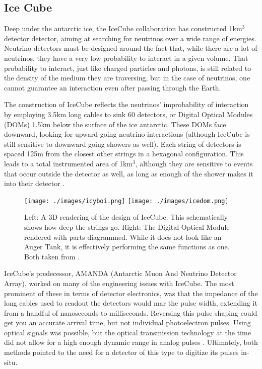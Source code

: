 \subsection{Ice Cube}
\label{icecube}
Deep under the antarctic ice, the IceCube collaboration has constructed 1km$^3$ detector detector, aiming at searching for neutrinos over a wide range of energies. Neutrino detectors must be designed around the fact that, while there are a lot of neutrinos, they have a very low probability to interact in a given volume. That probability to interact, just like charged particles and photons, is still related to the density of the medium they are traversing, but in the case of neutrinos, one cannot guarantee an interaction even after passing through the Earth. 

The construction of IceCube reflects the neutrinos' improbability of interaction by employing 3.5km long cables to sink 60 detectors, or Digital Optical Modules (DOMs) 1.5km below the surface of the ice antarctic. These DOMs face downward, looking for upward going neutrino interactions (although IceCube is still sensitive to downward going showers as well). Each string of detectors is spaced 125m from the closest other strings in a hexagonal configuration. This leads to a total instrumented area of 1km$^3$, although they are sensitive to events that occur outside the detector as well, as long as enough of the shower makes it into their detector \cite{icebasic}.

\begin{figure}[h!]
\begin{center}
\texttt{[image: ./images/icyboi.png]}
\texttt{[image: ./images/icedom.png]}
\caption[IceCube Diagram and DOM]{Left: A 3D rendering of the design of IceCube. This schematically shows how deep the strings go. Right: The Digital Optical Module rendered with parts diagrammed. While it does not look like an Auger Tank, it is effectively performing the same functions as one. Both taken from \cite{icedom}.}
\label{icediag}
\end{center}
\end{figure}
IceCube's predecessor, AMANDA  (Antarctic Muon And Neutrino Detector Array), worked on many of the engineering issues with IceCube. The most prominent of these in terms of detector electronics, was that the impedance of the long cables used to readout the detectors would mar the pulse width, extending it from a handful of nanoseconds to milliseconds. Reversing this pulse shaping could get you an accurate arrival time, but not individual photoelectron pulses. Using optical signals was possible, but the optical transmission technology at the time did not allow for a high enough dynamic range in analog pulses \cite{icebasic}. Ultimately, both methods pointed to the need for a detector of this type to digitize its pulses in-situ. 

